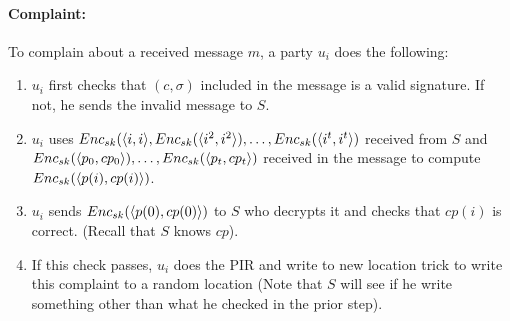\paragraph{Complaint:}
To complain about a received message $m$, a party $u_i$ does the following:
\begin{enumerate}
\item $u_i$ first checks that $(c,\sigma)$ included in the message is a valid signature.  If not, he sends the invalid message to $S$.  
\item $u_i$ uses $Enc_{sk}(\langle i, i \rangle ,Enc_{sk}(\langle i^2, i^2 \rangle),\ldots,Enc_{sk}(\langle i^t, i^t \rangle)$ received from $S$ and $Enc_{sk}(\langle p_0, cp_0 \rangle), \ldots, Enc_{sk}(\langle p_t, cp_t \rangle)$ received in the message to compute $Enc_{sk}(\langle p(i), cp(i) \rangle)$.
\item $u_i$ sends $Enc_{sk}(\langle p(0), cp(0) \rangle)$ to $S$ who decrypts it and checks that $cp(i)$ is correct.  (Recall that $S$ knows $cp$).
\item If this check passes, $u_i$ does the PIR and write to new location trick to write this complaint to a random location (Note that $S$ will see if he write something other than what he checked in the prior step).  
\end{enumerate}

